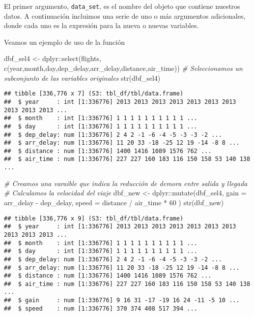 \documentclass[
]{book}
\newenvironment{Shaded}{\begin{snugshade}}{\end{snugshade}}
\newcommand{\AttributeTok}[1]{\textcolor[rgb]{0.77,0.63,0.00}{#1}}
\newcommand{\CommentTok}[1]{\textcolor[rgb]{0.56,0.35,0.01}{\textit{#1}}}
\newcommand{\DecValTok}[1]{\textcolor[rgb]{0.00,0.00,0.81}{#1}}
\newcommand{\FunctionTok}[1]{\textcolor[rgb]{0.00,0.00,0.00}{#1}}
\newcommand{\NormalTok}[1]{#1}
\newcommand{\OtherTok}[1]{\textcolor[rgb]{0.56,0.35,0.01}{#1}}
\newcommand{\SpecialCharTok}[1]{\textcolor[rgb]{0.00,0.00,0.00}{#1}}
\begin{document}
El primer argumento, \texttt{data\_set}, es el nombre del objeto que contiene nuestros datos. A continuación incluimos una serie de uno o más argumentos adicionales, donde cada uno es la expresión para la nueva o nuevas variables.

Veamos un ejemplo de uso de la función

\begin{Shaded}
\begin{Highlighting}[]
\NormalTok{dbf\_sel4 }\OtherTok{\textless{}{-}}\NormalTok{ dplyr}\SpecialCharTok{::}\FunctionTok{select}\NormalTok{(flights, }\FunctionTok{c}\NormalTok{(year,month,day,dep\_delay,arr\_delay,distance,air\_time)) }
\CommentTok{\# Seleccionamos un subconjunto de las variables originales}
\FunctionTok{str}\NormalTok{(dbf\_sel4)}
\end{Highlighting}
\end{Shaded}

\begin{verbatim}
## tibble [336,776 x 7] (S3: tbl_df/tbl/data.frame)
##  $ year     : int [1:336776] 2013 2013 2013 2013 2013 2013 2013 2013 2013 2013 ...
##  $ month    : int [1:336776] 1 1 1 1 1 1 1 1 1 1 ...
##  $ day      : int [1:336776] 1 1 1 1 1 1 1 1 1 1 ...
##  $ dep_delay: num [1:336776] 2 4 2 -1 -6 -4 -5 -3 -3 -2 ...
##  $ arr_delay: num [1:336776] 11 20 33 -18 -25 12 19 -14 -8 8 ...
##  $ distance : num [1:336776] 1400 1416 1089 1576 762 ...
##  $ air_time : num [1:336776] 227 227 160 183 116 150 158 53 140 138 ...
\end{verbatim}

\begin{Shaded}
\begin{Highlighting}[]
\CommentTok{\# Creamos una varaible que indica la reducción de demora entre salida y llegada}
\CommentTok{\# Calculamos la velocidad del viaje}
\NormalTok{dbf\_new }\OtherTok{\textless{}{-}}\NormalTok{ dplyr}\SpecialCharTok{::}\FunctionTok{mutate}\NormalTok{(dbf\_sel4,}
  \AttributeTok{gain =}\NormalTok{ arr\_delay }\SpecialCharTok{{-}}\NormalTok{ dep\_delay,}
  \AttributeTok{speed =}\NormalTok{ distance }\SpecialCharTok{/}\NormalTok{ air\_time }\SpecialCharTok{*} \DecValTok{60}
\NormalTok{) }
\FunctionTok{str}\NormalTok{(dbf\_new)}
\end{Highlighting}
\end{Shaded}

\begin{verbatim}
## tibble [336,776 x 9] (S3: tbl_df/tbl/data.frame)
##  $ year     : int [1:336776] 2013 2013 2013 2013 2013 2013 2013 2013 2013 2013 ...
##  $ month    : int [1:336776] 1 1 1 1 1 1 1 1 1 1 ...
##  $ day      : int [1:336776] 1 1 1 1 1 1 1 1 1 1 ...
##  $ dep_delay: num [1:336776] 2 4 2 -1 -6 -4 -5 -3 -3 -2 ...
##  $ arr_delay: num [1:336776] 11 20 33 -18 -25 12 19 -14 -8 8 ...
##  $ distance : num [1:336776] 1400 1416 1089 1576 762 ...
##  $ air_time : num [1:336776] 227 227 160 183 116 150 158 53 140 138 ...
##  $ gain     : num [1:336776] 9 16 31 -17 -19 16 24 -11 -5 10 ...
##  $ speed    : num [1:336776] 370 374 408 517 394 ...
\end{verbatim}
\end{document}
